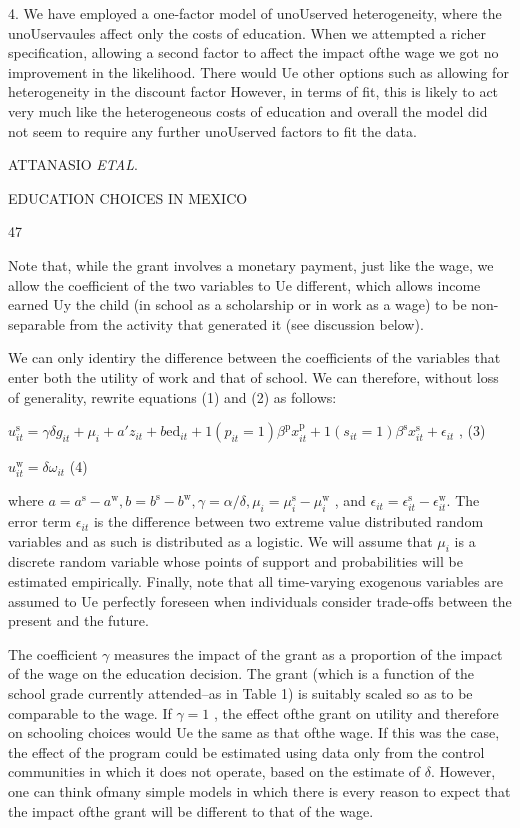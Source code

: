 4. We have employed a one-factor model of unoUserved heterogeneity, where the unoUservaules affect only the costs of education. When we attempted a richer specification, allowing a second factor to affect the impact ofthe wage we got no improvement in the likelihood. There would Ue other options such as allowing for heterogeneity in the discount factor However, in terms of fit, this is likely to act very much like the heterogeneous costs of education and overall the model did not seem to require any further unoUserved factors to fit the data.

ATTANASIO {\it ETAL}.

EDUCATION CHOICES IN MEXICO

47

Note that, while the grant involves a monetary payment, just like the wage, we allow the coefficient of the two variables to Ue different, which allows income earned Uy the child (in school as a scholarship or in work as a wage) to be non-separable from the activity that generated it (see discussion below).

We can only identiry the difference between the coefficients of the variables that enter both the utility of work and that of school. We can therefore, without loss of generality, rewrite equations (1) and (2) as follows:
\begin{center}
$u_{it}^{\mathrm{s}}=\gamma\delta g_{it}+\mu_{i}+a'z_{it}+b\mathrm{e}\mathrm{d}_{it}+1(p_{it}=1)\beta^{\mathrm{p}}x_{it}^{\mathrm{p}}+1(s_{it}=1)\beta^{\mathrm{s}}x_{it}^{\mathrm{s}}+\epsilon_{it}$ ,   (3)

$u_{it}^{\mathrm{w}}=\delta\omega_{it}$   (4)
\end{center}
where $a=a^{\mathrm{s}}-a^{\mathrm{w}}, b=b^{\mathrm{s}}-b^{\mathrm{w}}, \gamma =\alpha/\delta, \mu_{i}=\mu_{i}^{\mathrm{s}}-\mu_{i}^{\mathrm{w}}$ , and $\epsilon_{it}=\epsilon_{it}^{\mathrm{s}}-\epsilon_{it}^{\mathrm{w}}$. The error term $\epsilon_{it}$ is the difference between two extreme value distributed random variables and as such is distributed as a logistic. We will assume that $\mu_{i}$ is a discrete random variable whose points of support and probabilities will be estimated empirically. Finally, note that all time-varying exogenous variables are assumed to Ue perfectly foreseen when individuals consider trade-offs between the present and the future.

The coefficient $\gamma$ measures the impact of the grant as a proportion of the impact of the wage on the education decision. The grant (which is a function of the school grade currently attended--as in Table 1) is suitably scaled so as to be comparable to the wage. If $\gamma =1$ , the effect ofthe grant on utility and therefore on schooling choices would Ue the same as that ofthe wage. If this was the case, the effect of the program could be estimated using data only from the control communities in which it does not operate, based on the estimate of $\delta$. However, one can think ofmany simple models in which there is every reason to expect that the impact ofthe grant will be different to that of the wage.

